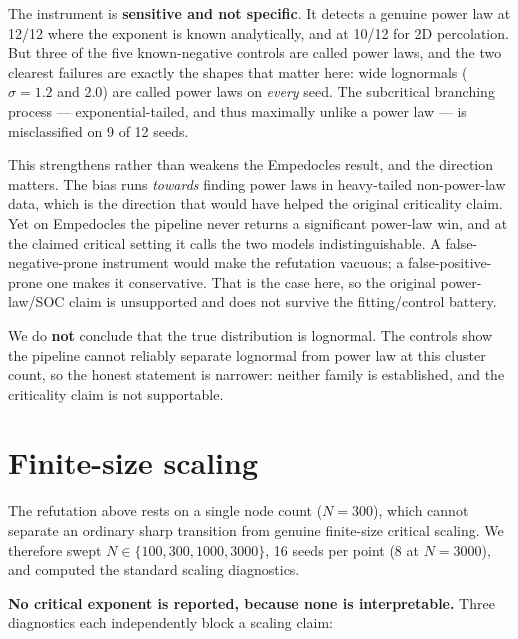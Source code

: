 \documentclass[11pt]{article}
\begin{document}
The instrument is \textbf{sensitive and not specific}. It detects a genuine
power law at 12/12 where the exponent is known analytically, and at 10/12 for
2D percolation. But three of the five known-negative controls are called power
laws, and the two clearest failures are exactly the shapes that matter here:
wide lognormals ($\sigma = 1.2$ and $2.0$) are called power laws on
\emph{every} seed. The subcritical branching process --- exponential-tailed,
and thus maximally unlike a power law --- is misclassified on 9 of 12 seeds.

This strengthens rather than weakens the Empedocles result, and the direction
matters. The bias runs \emph{towards} finding power laws in heavy-tailed
non-power-law data, which is the direction that would have helped the original
criticality claim. Yet on Empedocles the pipeline never returns a significant
power-law win, and at the claimed critical setting it calls the two models
indistinguishable. A false-negative-prone instrument would make the refutation
vacuous; a false-positive-prone one makes it conservative. That is the case
here, so the original power-law/SOC claim is unsupported and does not survive
the fitting/control battery.

We do \textbf{not} conclude that the true distribution is lognormal. The
controls show the pipeline cannot reliably separate lognormal from power law at
this cluster count, so the honest statement is narrower: neither family is
established, and the criticality claim is not supportable.

\section{Finite-size scaling}

The refutation above rests on a single node count ($N = 300$), which cannot
separate an ordinary sharp transition from genuine finite-size critical
scaling. We therefore swept $N \in \{100, 300, 1000, 3000\}$, 16 seeds per
point (8 at $N = 3000$), and computed the standard scaling diagnostics.

\textbf{No critical exponent is reported, because none is interpretable.}
Three diagnostics each independently block a scaling claim:
\end{document}
